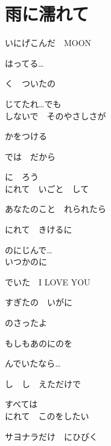 \section{ 雨に濡れて}
\large{

いにげこんだ　MOON

はってる…

く　ついたの

じてたれ…でも
\\

しないで　そのやさしさが

かをつける

では　だから

に　ろう
\\

にれて　いごと　して

あなたのこと　れられたら

にれて　きけるに

のにじんで…
\\

いつかのに

でいた　I LOVE YOU

すぎたの　いがに

のさったよ

もしもあのにのを

んでいたなら…

し　し　えただけで

すべては　
\\

にれて　このをしたい

サヨナラだけ　にひびく

}
